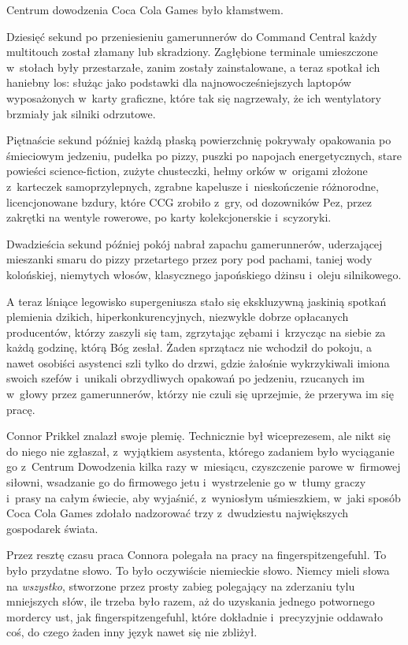 \documentclass[oneside,polish,11pt,rmheadings]{mwbk}
\begin{document}
Centrum dowodzenia Coca Cola Games było kłamstwem.

Dziesięć sekund po przeniesieniu gamerunnerów do Command Central każdy multitouch został złamany lub skradziony. Zagłębione terminale umieszczone w~stołach były przestarzałe, zanim zostały zainstalowane, a teraz spotkał ich haniebny los: służąc jako podstawki dla najnowocześniejszych laptopów wyposażonych w~karty graficzne, które tak się nagrzewały, że ich wentylatory brzmiały jak silniki odrzutowe.

Piętnaście sekund później każdą płaską powierzchnię pokrywały opakowania po śmieciowym jedzeniu, pudełka po pizzy, puszki po napojach energetycznych, stare powieści science-fiction, zużyte chusteczki, hełmy orków w~origami złożone z~karteczek samoprzylepnych, zgrabne kapelusze i~nieskończenie różnorodne, licencjonowane bzdury, które CCG zrobiło z~gry, od dozowników Pez, przez zakrętki na wentyle rowerowe, po karty kolekcjonerskie i~scyzoryki.

Dwadzieścia sekund później pokój nabrał zapachu gamerunnerów, uderzającej mieszanki smaru do pizzy przetartego przez pory pod pachami, taniej wody kolońskiej, niemytych włosów, klasycznego japońskiego dżinsu i~oleju silnikowego.

A teraz lśniące legowisko supergeniusza stało się ekskluzywną jaskinią spotkań plemienia dzikich, hiperkonkurencyjnych, niezwykle dobrze opłacanych producentów, którzy zaszyli się tam, zgrzytając zębami i~krzycząc na siebie za każdą godzinę, którą Bóg zesłał. Żaden sprzątacz nie wchodził do pokoju, a nawet osobiści asystenci szli tylko do drzwi, gdzie żałośnie wykrzykiwali imiona swoich szefów i~unikali obrzydliwych opakowań po jedzeniu, rzucanych im w~głowy przez gamerunnerów, którzy nie czuli się uprzejmie, że przerywa im się pracę.

Connor Prikkel znalazł swoje plemię. Technicznie był wiceprezesem, ale nikt się do niego nie zgłaszał, z~wyjątkiem asystenta, którego zadaniem było wyciąganie go z~Centrum Dowodzenia kilka razy w~miesiącu, czyszczenie parowe w~firmowej siłowni, wsadzanie go do firmowego jetu i~wystrzelenie go w~tłumy graczy i~prasy na całym świecie, aby wyjaśnić, z~wyniosłym uśmieszkiem, w~jaki sposób Coca Cola Games zdołało nadzorować trzy z~dwudziestu największych gospodarek świata.

Przez resztę czasu praca Connora polegała na pracy na fingerspitzengefuhl. To było przydatne słowo. To było oczywiście niemieckie słowo. Niemcy mieli słowa na \textit{wszystko}, stworzone przez prosty zabieg polegający na zderzaniu tylu mniejszych słów, ile trzeba było razem, aż do uzyskania jednego potwornego mordercy ust, jak fingerspitzengefuhl, które dokładnie i~precyzyjnie oddawało coś, do czego żaden inny język nawet się nie zbliżył.
\end{document}
